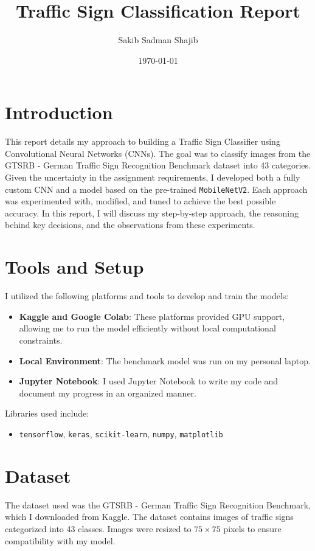\documentclass[11pt]{article}
\title{Traffic Sign Classification Report}
\author{Sakib Sadman Shajib}
\date{\today}
\begin{document}
\maketitle

\section{Introduction}
This report details my approach to building a Traffic Sign Classifier using Convolutional Neural Networks (CNNs). The goal was to classify images from the GTSRB - German Traffic Sign Recognition Benchmark dataset into 43 categories. Given the uncertainty in the assignment requirements, I developed both a fully custom CNN and a model based on the pre-trained \texttt{MobileNetV2}. Each approach was experimented with, modified, and tuned to achieve the best possible accuracy. In this report, I will discuss my step-by-step approach, the reasoning behind key decisions, and the observations from these experiments.

\section{Tools and Setup}
I utilized the following platforms and tools to develop and train the models:
\begin{itemize}
    \item \textbf{Kaggle and Google Colab}: These platforms provided GPU support, allowing me to run the model efficiently without local computational constraints.
    \item \textbf{Local Environment}: The benchmark model was run on my personal laptop.
    \item \textbf{Jupyter Notebook}: I used Jupyter Notebook to write my code and document my progress in an organized manner.
\end{itemize}

Libraries used include:
\begin{itemize}
    \item \texttt{tensorflow}, \texttt{keras}, \texttt{scikit-learn}, \texttt{numpy}, \texttt{matplotlib}
\end{itemize}

\section{Dataset}
The dataset used was the GTSRB - German Traffic Sign Recognition Benchmark, which I downloaded from Kaggle. The dataset contains images of traffic signs categorized into 43 classes. Images were resized to $75 \times 75$ pixels to ensure compatibility with my model.
\end{document}
